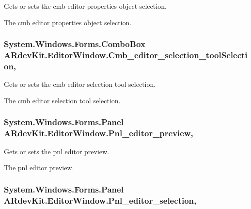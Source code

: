 Gets or sets the cmb editor properties object selection. 

The cmb editor properties object selection. \hypertarget{class_a_rdev_kit_1_1_editor_window_a0937e4db376a67530e488c174d512925}{
\subsubsection[{Cmb\-\_\-editor\-\_\-selection\-\_\-tool\-Selection}]{\setlength{\rightskip}{0pt plus 5cm}System.\-Windows.\-Forms.\-Combo\-Box A\-Rdev\-Kit.\-Editor\-Window.\-Cmb\-\_\-editor\-\_\-selection\-\_\-tool\-Selection\hspace{0.3cm}{\ttfamily [get]}, {\ttfamily [set]}}}\label{class_a_rdev_kit_1_1_editor_window_a0937e4db376a67530e488c174d512925}


Gets or sets the cmb editor selection tool selection. 

The cmb editor selection tool selection. \hypertarget{class_a_rdev_kit_1_1_editor_window_a63d02d43b7dfe8841d6e1204948ecb17}{
\subsubsection[{Pnl\-\_\-editor\-\_\-preview}]{\setlength{\rightskip}{0pt plus 5cm}System.\-Windows.\-Forms.\-Panel A\-Rdev\-Kit.\-Editor\-Window.\-Pnl\-\_\-editor\-\_\-preview\hspace{0.3cm}{\ttfamily [get]}, {\ttfamily [set]}}}\label{class_a_rdev_kit_1_1_editor_window_a63d02d43b7dfe8841d6e1204948ecb17}


Gets or sets the pnl editor preview. 

The pnl editor preview. \hypertarget{class_a_rdev_kit_1_1_editor_window_a601e295ca226828c6ca4eadc21101a78}{
\subsubsection[{Pnl\-\_\-editor\-\_\-selection}]{\setlength{\rightskip}{0pt plus 5cm}System.\-Windows.\-Forms.\-Panel A\-Rdev\-Kit.\-Editor\-Window.\-Pnl\-\_\-editor\-\_\-selection\hspace{0.3cm}{\ttfamily [get]}, {\ttfamily [set]}}}\label{class_a_rdev_kit_1_1_editor_window_a601e295ca226828c6ca4eadc21101a78}


